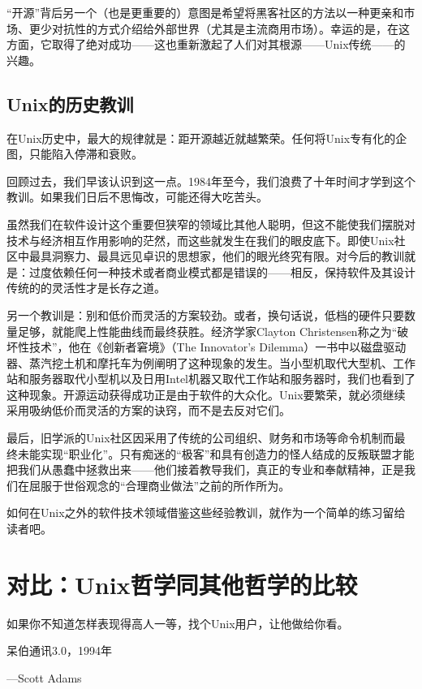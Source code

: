 \documentclass[12pt,oneside]{book}
\begin{document}
\begin{common-format}
“开源”背后另一个（也是更重要的）意图是希望将黑客社区的方法以一种更亲和市场、更少对抗性的方式介绍给外部世界（尤其是主流商用市场）。幸运的是，在这方面，它取得了绝对成功——这也重新激起了人们对其根源——Unix传统——的兴趣。

\section{Unix的历史教训}
在Unix历史中，最大的规律就是：距开源越近就越繁荣。任何将Unix专有化的企图，只能陷入停滞和衰败。

回顾过去，我们早该认识到这一点。1984年至今，我们浪费了十年时间才学到这个教训。如果我们日后不思悔改，可能还得大吃苦头。

虽然我们在软件设计这个重要但狭窄的领域比其他人聪明，但这不能使我们摆脱对技术与经济相互作用影响的茫然，而这些就发生在我们的眼皮底下。即使Unix社区中最具洞察力、最具远见卓识的思想家，他们的眼光终究有限。对今后的教训就是：过度依赖任何一种技术或者商业模式都是错误的——相反，保持软件及其设计传统的的灵活性才是长存之道。

另一个教训是：别和低价而灵活的方案较劲。或者，换句话说，低档的硬件只要数量足够，就能爬上性能曲线而最终获胜。经济学家Clayton Christensen称之为“破坏性技术”，他在《创新者窘境》（The Innovator's Dilemma）\cite{Christensen}一书中以磁盘驱动器、蒸汽挖土机和摩托车为例阐明了这种现象的发生。当小型机取代大型机、工作站和服务器取代小型机以及日用Intel机器又取代工作站和服务器时，我们也看到了这种现象。开源运动获得成功正是由于软件的大众化。Unix要繁荣，就必须继续采用吸纳低价而灵活的方案的诀窍，而不是去反对它们。

最后，旧学派的Unix社区因采用了传统的公司组织、财务和市场等命令机制而最终未能实现“职业化”。只有痴迷的“极客”和具有创造力的怪人结成的反叛联盟才能把我们从愚蠢中拯救出来——他们接着教导我们，真正的专业和奉献精神，正是我们在屈服于世俗观念的“合理商业做法”之前的所作所为。

如何在Unix之外的软件技术领域借鉴这些经验教训，就作为一个简单的练习留给读者吧。




\chapter{对比：Unix哲学同其他哲学的比较}
\begin{flushright}
\begin{notecard}{18em}
如果你不知道怎样表现得高人一等，找个Unix用户，让他做给你看。

{\hfill 呆伯通讯3.0，1994年}

{\hfill —Scott Adams}
\end{notecard}
\end{flushright}


\end{common-format}
\end{document}
